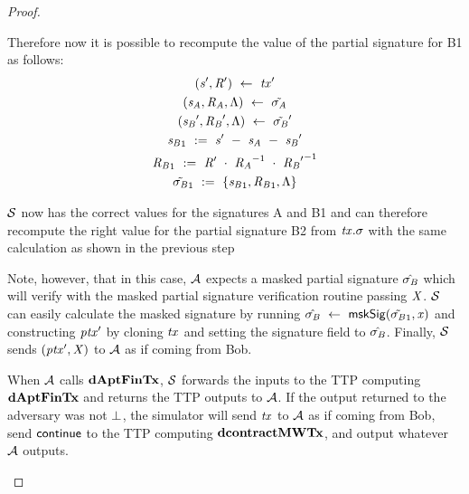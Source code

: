 \begin{proof}
\begin{asparaenum}
\begin{asparaenum}
            Therefore now it is possible to recompute the value of the partial signature for B1 as follows:
            \begin{gather*}
                ({\mathit{s}}', {\mathit{R}}') ~\leftarrow~ {\mathit{tx}}' \\
                (\mathit{s}_{\mathit{A}}, \mathit{R}_{\mathit{A}}, \Lambda) ~\leftarrow~ \tilde{\sigma_{\mathit{A}}} \\
                ({\mathit{s}_{\mathit{B}}}', {\mathit{R}_{\mathit{B}}}', \Lambda) ~\leftarrow~ {\tilde{\sigma_{\mathit{B}}}}' \\
                {\mathit{s}_{\mathit{B}}}_1 ~:=~ {\mathit{s}}' ~-~ \mathit{s}_{\mathit{A}} ~-~ {\mathit{s}_{\mathit{B}}}' \\
                {\mathit{R}_{\mathit{B}}}_1 ~:=~ {\mathit{R}}' ~\cdot~ {\mathit{R}_{\mathit{A}}}^{-1} ~\cdot~ {{\mathit{R}_{\mathit{B}}}'}^{-1} \\
                {\tilde{\sigma_{\mathit{B}}}}_1 ~:=~ \{ {\mathit{s}_{\mathit{B}}}_1, {\mathit{R}_{\mathit{B}}}_1, \Lambda \}
            \end{gather*}
            \item $\mathcal{S}$ now has the correct values for the signatures A and B1 and can therefore recompute the right value for the partial signature B2 from $\mathit{tx}.\sigma$ with the same calculation as shown in the previous step
        \end{asparaenum}
        Note, however, that in this case, $\mathcal{A}$ expects a masked partial signature $\hat{\sigma_{\mathit{B}}}$ which will verify with the masked partial signature verification routine passing $\mathit{X}$.
        $\mathcal{S}$ can easily calculate the masked signature by running $\hat{\sigma_{\mathit{B}}} ~\leftarrow~ \mathsf{mskSig}({\tilde{\sigma_{\mathit{B}}}_1}, \mathit{x})$ and constructing ${\mathit{ptx}}'$ by cloning $\mathit{tx}$ and setting the signature field to $\hat{\sigma_{\mathit{B}}}$.
        Finally, $\mathcal{S}$ sends $({\mathit{ptx}}',\mathit{X})$ to $\mathcal{A}$ as if coming from Bob.
        \item When $\mathcal{A}$ calls $\mathbf{dAptFinTx}$, $\mathcal{S}$ forwards the inputs to the TTP computing $\mathbf{dAptFinTx}$ and returns the TTP outputs to $\mathcal{A}$.
        If the output returned to the adversary was not $\bot$, the simulator will send $\mathit{tx}$ to $\mathcal{A}$ as if coming from Bob, send $\mathsf{continue}$ to the TTP computing $\mathbf{dcontractMWTx}$, and output whatever $\mathcal{A}$ outputs.
    \end{asparaenum}


\end{proof}
